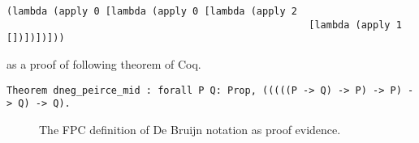 \begin{lstlisting}[basicstyle=\ttfamily,language=lprolog]
(lambda (apply 0 [lambda (apply 0 [lambda (apply 2 
                                                    [lambda (apply 1 [])])])]))
\end{lstlisting}
as a proof of following theorem of Coq.
\begin{lstlisting}[basicstyle=\ttfamily,language=lprolog]
Theorem dneg_peirce_mid : forall P Q: Prop, (((((P -> Q) -> P) -> P) -> Q) -> Q).
\end{lstlisting}

\begin{figure}


\caption{The FPC definition of De Bruijn notation as proof evidence.}
\label{fig:debruijn}
\end{figure}



